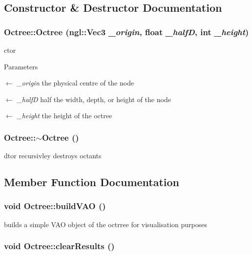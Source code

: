 \subsection{Constructor \& Destructor Documentation}
\hypertarget{classOctree_a18c97528102fc6c7b0afcf62d4256d6b}{
\subsubsection[{Octree}]{\setlength{\rightskip}{0pt plus 5cm}Octree::Octree (ngl::Vec3 {\em \_\-origin}, \/  float {\em \_\-halfD}, \/  int {\em \_\-height})}}
\label{classOctree_a18c97528102fc6c7b0afcf62d4256d6b}


ctor 
\begin{DoxyParams}{Parameters}
\item[\mbox{$\leftarrow$} {\em \_\-origin}]the physical centre of the node \item[\mbox{$\leftarrow$} {\em \_\-halfD}]half the width, depth, or height of the node \item[\mbox{$\leftarrow$} {\em \_\-height}]the height of the octree \end{DoxyParams}
\hypertarget{classOctree_a6705a6ae06fab5a0dfdd79f45576020d}{
\subsubsection[{$\sim$Octree}]{\setlength{\rightskip}{0pt plus 5cm}Octree::$\sim$Octree ()}}
\label{classOctree_a6705a6ae06fab5a0dfdd79f45576020d}


dtor recursivley destroys octants 

\subsection{Member Function Documentation}
\hypertarget{classOctree_a6ac1e8420a5b02c854e8ebcf8e18a401}{
\subsubsection[{buildVAO}]{\setlength{\rightskip}{0pt plus 5cm}void Octree::buildVAO ()}}
\label{classOctree_a6ac1e8420a5b02c854e8ebcf8e18a401}


builds a simple VAO object of the octrree for visualisation purposes \hypertarget{classOctree_aca0adcb1047b4ced99f1e3449ac88036}{
\subsubsection[{clearResults}]{\setlength{\rightskip}{0pt plus 5cm}void Octree::clearResults ()}}
\label{classOctree_aca0adcb1047b4ced99f1e3449ac88036}


